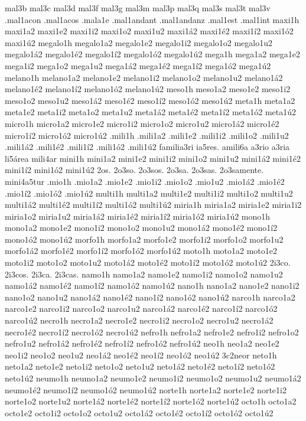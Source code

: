 {mal3b
mal3c
mal3d
mal3f
mal3g
mal3m
mal3p
mal3q
mal3s
mal3t
mal3v
.mal1acon
.mal1acos
.mala1e
.mal1andant
.mal1andanz
.mal1est
.mal1int
maxi1h
maxi1a2 maxi1e2 maxi1i2 maxi1o2 maxi1u2
maxi1á2 maxi1é2 maxi1í2 maxi1ó2 maxi1ú2
megalo1h
megalo1a2 megalo1e2 megalo1i2 megalo1o2 megalo1u2
megalo1á2 megalo1é2 megalo1í2 megalo1ó2 megalo1ú2
mega1h
mega1a2 mega1e2 mega1i2 mega1o2 mega1u2
mega1á2 mega1é2 mega1í2 mega1ó2 mega1ú2
melano1h
melano1a2 melano1e2 melano1i2 melano1o2 melano1u2
melano1á2 melano1é2 melano1í2 melano1ó2 melano1ú2
meso1h
meso1a2 meso1e2 meso1i2 meso1o2 meso1u2
meso1á2 meso1é2 meso1í2 meso1ó2 meso1ú2
meta1h
meta1a2 meta1e2 meta1i2 meta1o2 meta1u2
meta1á2 meta1é2 meta1í2 meta1ó2 meta1ú2
micro1h
micro1a2 micro1e2 micro1i2 micro1o2 micro1u2
micro1á2 micro1é2 micro1í2 micro1ó2 micro1ú2
.mili1h
.mili1a2 .mili1e2 .mili1i2 .mili1o2 .mili1u2
.mili1á2 .mili1é2 .mili1í2 .mili1ó2 .mili1ú2
familia3ri
ia5res.
amili6a
a3rio
a3ria
li5área
mili4ar
mini1h
mini1a2 mini1e2 mini1i2 mini1o2 mini1u2
mini1á2 mini1é2 mini1í2 mini1ó2 mini1ú2
2os.
2o3so.
2o3sos.
2o3sa.
2o3sas.
2o3samente.
mini4a5tur
.mio1h
.mio1a2 .mio1e2 .mio1i2 .mio1o2 .mio1u2
.mio1á2 .mio1é2 .mio1í2 .mio1ó2 .mio1ú2
multi1h
multi1a2 multi1e2 multi1i2 multi1o2 multi1u2
multi1á2 multi1é2 multi1í2 multi1ó2 multi1ú2
miria1h
miria1a2 miria1e2 miria1i2 miria1o2 miria1u2
miria1á2 miria1é2 miria1í2 miria1ó2 miria1ú2
mono1h
mono1a2 mono1e2 mono1i2 mono1o2 mono1u2
mono1á2 mono1é2 mono1í2 mono1ó2 mono1ú2
morfo1h
morfo1a2 morfo1e2 morfo1i2 morfo1o2 morfo1u2
morfo1á2 morfo1é2 morfo1í2 morfo1ó2 morfo1ú2
moto1h
moto1a2 moto1e2 moto1i2 moto1o2 moto1u2
moto1á2 moto1é2 moto1í2 moto1ó2 moto1ú2
2i3co.
2i3cos.
2i3ca.
2i3cas.
namo1h
namo1a2 namo1e2 namo1i2 namo1o2 namo1u2
namo1á2 namo1é2 namo1í2 namo1ó2 namo1ú2
nano1h
nano1a2 nano1e2 nano1i2 nano1o2 nano1u2
nano1á2 nano1é2 nano1í2 nano1ó2 nano1ú2
narco1h
narco1a2 narco1e2 narco1i2 narco1o2 narco1u2
narco1á2 narco1é2 narco1í2 narco1ó2 narco1ú2
necro1h
necro1a2 necro1e2 necro1i2 necro1o2 necro1u2
necro1á2 necro1é2 necro1í2 necro1ó2 necro1ú2
nefro1h
nefro1a2 nefro1e2 nefro1i2 nefro1o2 nefro1u2
nefro1á2 nefro1é2 nefro1í2 nefro1ó2 nefro1ú2
neo1h
neo1a2 neo1e2 neo1i2 neo1o2 neo1u2
neo1á2 neo1é2 neo1í2 neo1ó2 neo1ú2
3c2neor
neto1h
neto1a2 neto1e2 neto1i2 neto1o2 neto1u2
neto1á2 neto1é2 neto1í2 neto1ó2 neto1ú2
neumo1h
neumo1a2 neumo1e2 neumo1i2 neumo1o2 neumo1u2
neumo1á2 neumo1é2 neumo1í2 neumo1ó2 neumo1ú2
norte1h
norte1a2 norte1e2 norte1i2 norte1o2 norte1u2
norte1á2 norte1é2 norte1í2 norte1ó2 norte1ú2
octo1h
octo1a2 octo1e2 octo1i2 octo1o2 octo1u2
octo1á2 octo1é2 octo1í2 octo1ó2 octo1ú2
}

